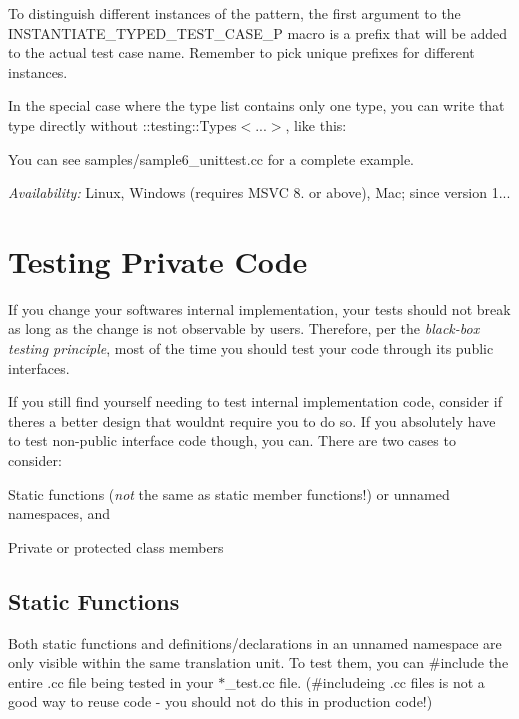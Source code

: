 To distinguish different instances of the pattern, the first argument to the {\ttfamily I\+N\+S\+T\+A\+N\+T\+I\+A\+T\+E\+\_\+\+T\+Y\+P\+E\+D\+\_\+\+T\+E\+S\+T\+\_\+\+C\+A\+S\+E\+\_\+P} macro is a prefix that will be added to the actual test case name. Remember to pick unique prefixes for different instances.

In the special case where the type list contains only one type, you can write that type directly without {\ttfamily \+::testing\+::\+Types$<$...$>$}, like this\+:


\begin{DoxyCode}{0}
\end{DoxyCode}


You can see {\ttfamily samples/sample6\+\_\+unittest.\+cc} for a complete example.

{\itshape Availability\+:} Linux, Windows (requires M\+S\+VC 8. or above), Mac; since version 1...

\section*{Testing Private Code}

If you change your software\textquotesingle{}s internal implementation, your tests should not break as long as the change is not observable by users. Therefore, per the {\itshape black-\/box testing principle}, most of the time you should test your code through its public interfaces.

If you still find yourself needing to test internal implementation code, consider if there\textquotesingle{}s a better design that wouldn\textquotesingle{}t require you to do so. If you absolutely have to test non-\/public interface code though, you can. There are two cases to consider\+:


\begin{DoxyItemize}
\item Static functions ({\itshape not} the same as static member functions!) or unnamed namespaces, and
\item Private or protected class members
\end{DoxyItemize}

\subsection*{Static Functions}

Both static functions and definitions/declarations in an unnamed namespace are only visible within the same translation unit. To test them, you can {\ttfamily \#include} the entire {\ttfamily .cc} file being tested in your {\ttfamily $\ast$\+\_\+test.cc} file. ({\ttfamily \#include}ing {\ttfamily .cc} files is not a good way to reuse code -\/ you should not do this in production code!)

